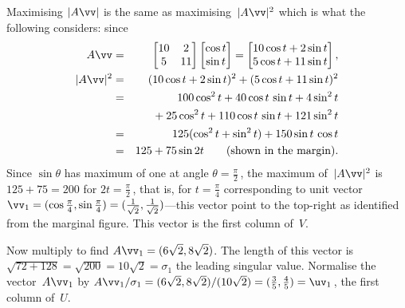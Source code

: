 \begin{example}
\begin{solution}
Maximising \(|A\vv|\) is the same as maximising~\(|A\vv|^2\) which is what the following considers: since
\begin{eqnarray*}
A\vv&=&\begin{bmatrix} 10&2\\5&11 \end{bmatrix}
\begin{bmatrix} \cos t\\\sin t \end{bmatrix}
=\begin{bmatrix} 10\cos t+2\sin t\\5\cos t+11\sin t \end{bmatrix},
\\|A\vv|^2&=&(10\cos t+2\sin t)^2+(5\cos t+11\sin t)^2
\\&=&100\cos^2 t+40\cos t\,\sin t+4\sin^2 t
\\&&{}+25\cos^2 t+110\cos t\,\sin t+121\sin^2 t
\\&=&125(\cos^2t+\sin^2t)+150\sin t\,\cos t
\\&=&125+75\sin 2t \qquad(\text{shown in the margin}).
\end{eqnarray*}
%
Since \(\sin\theta\) has maximum of one at angle \(\theta=\frac\pi2\)\,, the maximum of~\(|A\vv|^2\) is~\(125+75=200\) for \(2t=\frac\pi2\)\,, that is, for \(t=\frac\pi4\) corresponding to unit vector \(\vv_1=(\cos\frac\pi4,\sin\frac\pi4)=(\frac1{\sqrt2},\frac1{\sqrt2})\)---this vector point to the top-right as identified from the marginal figure.
This vector is the first column of~\(V\).

Now multiply to find \(A\vv_1=(6\sqrt2,8\sqrt2)\).  
The length of this vector is \(\sqrt{72+128}=\sqrt{200}=10\sqrt 2=\sigma_1\) the leading singular value.  
Normalise the vector~\(A\vv_1\) by \(A\vv_1/\sigma_1 =(6\sqrt2,8\sqrt2)/(10\sqrt2) =(\frac35,\frac45) =\uv_1\)\,, the first column of~\(U\).


\end{solution}
\end{example}
